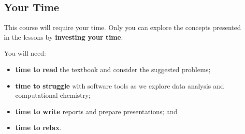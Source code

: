 \subsection{Your Time}

This course will require your time. Only you can explore the concepts presented in the lessons by \textbf{investing your time}.

You will need:

\begin{itemize}
\item \textbf{time to read} the textbook and consider the suggested problems;
\item \textbf{time to struggle} with software tools as we explore data analysis and computational chemistry;
\item \textbf{time to write} reports and prepare presentations; and
\item \textbf{time to relax}.
\end{itemize}